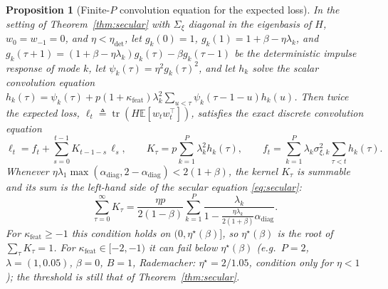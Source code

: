 \documentclass[11pt]{article}
\newtheorem{proposition}[theorem]{Proposition}
\theoremstyle{remark}
\newcommand{\E}{\mathbb{E}}
\newcommand{\tr}{\operatorname{tr}}
\begin{document}
\begin{proposition}[Finite-$P$ convolution equation for the expected loss]\label{prop:renewal}
In the setting of Theorem~\ref{thm:secular} with $\Sigma_\xi$ diagonal in the eigenbasis of $H$, $w_0 = w_{-1} = 0$, and $\eta < \eta_{\mathrm{det}}$, let $g_k(0) = 1$, $g_k(1) = 1+\beta-\eta\lambda_k$, and $g_k(\tau+1) = (1+\beta-\eta\lambda_k)g_k(\tau) - \beta g_k(\tau-1)$ be the deterministic impulse response of mode $k$, let $\psi_k(\tau) = \eta^2 g_k(\tau)^2$, and let $h_k$ solve the scalar convolution equation $h_k(\tau) = \psi_k(\tau) + p(1+\kappa_{\mathrm{feat}})\lambda_k^2\sum_{u<\tau}\psi_k(\tau-1-u)h_k(u)$. Then twice the expected loss, $\ell_t \triangleq \tr(H\E[w_t w_t^\top])$, satisfies the exact discrete convolution equation
\begin{equation}\label{eq:renewal}
\ell_t = f_t + \sum_{s=0}^{t-1} K_{t-1-s}\,\ell_s, \qquad K_\tau = p\sum_{k=1}^P \lambda_k^2 h_k(\tau), \qquad f_t = \sum_{k=1}^P \lambda_k \sigma_{\xi,k}^2 \sum_{\tau < t} h_k(\tau).
\end{equation}
Whenever $\eta\lambda_1\max(\alpha_{\mathrm{diag}}, 2-\alpha_{\mathrm{diag}}) < 2(1+\beta)$, the kernel $K_\tau$ is summable and its sum is the left-hand side of the secular equation \eqref{eq:secular}:
\begin{equation}\label{eq:kernelsum}
\sum_{\tau=0}^\infty K_\tau = \frac{\eta p}{2(1-\beta)}\sum_{k=1}^P \frac{\lambda_k}{1 - \frac{\eta\lambda_k}{2(1+\beta)}\alpha_{\mathrm{diag}}}.
\end{equation}
For $\kappa_{\mathrm{feat}}\ge-1$ this condition holds on $(0,\eta^\star(\beta)]$, so $\eta^\star(\beta)$ is the root of $\sum_\tau K_\tau=1$. For $\kappa_{\mathrm{feat}}\in[-2,-1)$ it can fail below $\eta^\star(\beta)$ (e.g.\ $P=2$, $\lambda=(1,0.05)$, $\beta=0$, $B=1$, Rademacher: $\eta^\star=2/1.05$, condition only for $\eta<1$); the threshold is still that of Theorem~\ref{thm:secular}.
\end{proposition}
\end{document}
